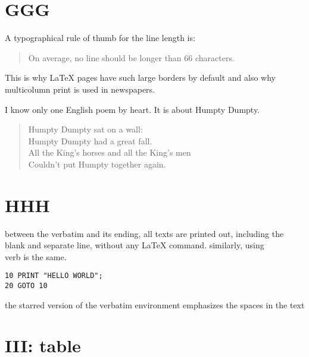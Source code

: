 \documentclass{article}
\begin{document}
\section{GGG}
A typographical rule of thumb
for the line length is:
\begin{quote}
On average, no line should
be longer than 66 characters.
\end{quote}
This is why \LaTeX{} pages have
such large borders by default and
also why multicolumn print is
used in newspapers.\newline

I know only one English poem by
heart. It is about Humpty Dumpty.
\begin{flushleft}
\begin{verse}
Humpty Dumpty sat on a wall:\\
Humpty Dumpty had a great fall.\\
All the King’s horses and all
the King’s men\\
Couldn’t put Humpty together
again.
\end{verse}
\end{flushleft}



\section{HHH}

between the verbatim and its ending, all texts are printed out, including the blank and separate line, without any \LaTeX{} command.
similarly, using \\{verb} is the same.

\begin{verbatim}
10 PRINT "HELLO WORLD";
20 GOTO 10
\end{verbatim}

\begin{verbatim*}
the starred version of
the    verbatim environment emphasizes
the spaces   in the text
\end{verbatim*}


\section{III: table}

\end{document}
